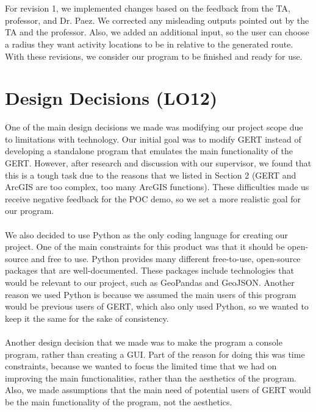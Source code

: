 \documentclass{article}
\begin{document}
\\ \\
For revision 1, we implemented changes based on the feedback from the TA, professor, and Dr. Paez. We corrected any misleading outputs pointed out by the TA and the professor. Also, we added an additional input, so the user can choose a radius they want activity locations to be in relative to the generated route. With these revisions, we consider our program to be finished and ready for use.

\section{Design Decisions (LO12)}

One of the main design decisions we made was modifying our project scope due to limitations with technology. Our initial goal was to modify GERT instead of developing a standalone program that emulates the main functionality of the GERT. However, after research and discussion with our supervisor, we found that this is a tough task due to the reasons that we listed in Section 2 (GERT and ArcGIS are too complex, too many ArcGIS functions). These difficulties made us receive negative feedback for the POC demo, so we set a more realistic goal for our program.
\\ \\ 
We also decided to use Python as the only coding language for creating our project. One of the main constraints for this product was that it should be open-source and free to use. Python provides many different free-to-use, open-source packages that are well-documented. These packages include technologies that would be relevant to our project, such as GeoPandas and GeoJSON. Another reason we used Python is because we assumed the main users of this program would be previous users of GERT, which also only used Python, so we wanted to keep it the same for the sake of consistency.
\\ \\
Another design decision that we made was to make the program a console program, rather than creating a GUI. Part of the reason for doing this was time constraints, because we wanted to focus the limited time that we had on improving the main functionalities, rather than the aesthetics of the program. Also, we made assumptions that the main need of potential users of GERT would be the main functionality of the program, not the aesthetics.
\end{document}
